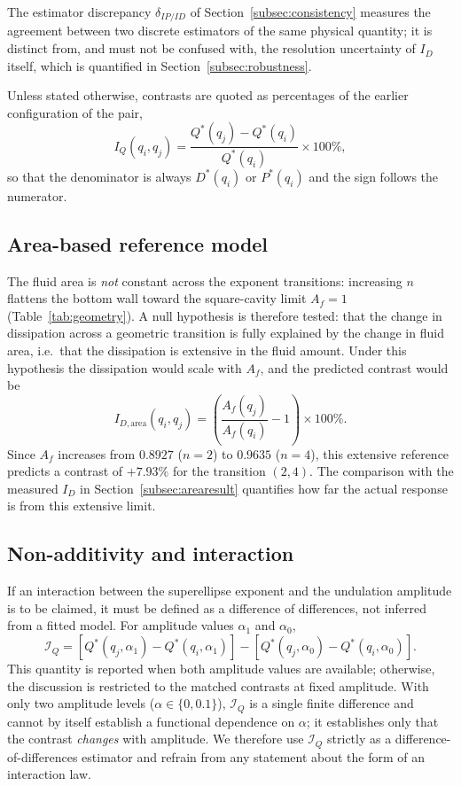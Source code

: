 The estimator discrepancy $\delta_{IP/ID}$ of Section~\ref{subsec:consistency} measures the agreement between two discrete estimators of the same physical quantity; it is distinct from, and must not be confused with, the resolution uncertainty of $I_D$ itself, which is quantified in Section~\ref{subsec:robustness}.

Unless stated otherwise, contrasts are quoted as percentages of the earlier configuration of the pair,
\begin{equation}
I_Q(q_i,q_j)=\frac{Q^*(q_j)-Q^*(q_i)}{Q^*(q_i)}\times 100\%,
\end{equation}
so that the denominator is always $D^*(q_i)$ or $P^*(q_i)$ and the sign follows the numerator.

\subsection{Area-based reference model}
\label{subsec:area}

The fluid area is \emph{not} constant across the exponent transitions: increasing $n$ flattens the bottom wall toward the square-cavity limit $A_f=1$ (Table~\ref{tab:geometry}). A null hypothesis is therefore tested: that the change in dissipation across a geometric transition is fully explained by the change in fluid area, i.e.\ that the dissipation is extensive in the fluid amount. Under this hypothesis the dissipation would scale with $A_f$, and the predicted contrast would be
\begin{equation}
I_{D,\mathrm{area}}(q_i,q_j) = \left(\frac{A_f(q_j)}{A_f(q_i)} - 1\right)\times 100\%.
\label{eq:area}
\end{equation}
Since $A_f$ increases from $0.8927$ ($n=2$) to $0.9635$ ($n=4$), this extensive reference predicts a contrast of $+7.93\%$ for the transition $(2,4)$. The comparison with the measured $I_D$ in Section~\ref{subsec:arearesult} quantifies how far the actual response is from this extensive limit.
\subsection{Non-additivity and interaction}
\label{subsec:interaction}

If an interaction between the superellipse exponent and the undulation amplitude is to be claimed, it must be defined as a difference of differences, not inferred from a fitted model. For amplitude values $\alpha_1$ and $\alpha_0$,
\begin{equation}
\mathcal{I}_Q = \left[Q^*(q_j,\alpha_1)-Q^*(q_i,\alpha_1)\right] - \left[Q^*(q_j,\alpha_0)-Q^*(q_i,\alpha_0)\right].
\end{equation}
This quantity is reported when both amplitude values are available; otherwise, the discussion is restricted to the matched contrasts at fixed amplitude. With only two amplitude levels ($\alpha\in\{0,0.1\}$), $\mathcal{I}_Q$ is a single finite difference and cannot by itself establish a functional dependence on $\alpha$; it establishes only that the contrast \emph{changes} with amplitude. We therefore use $\mathcal{I}_Q$ strictly as a difference-of-differences estimator and refrain from any statement about the form of an interaction law.




